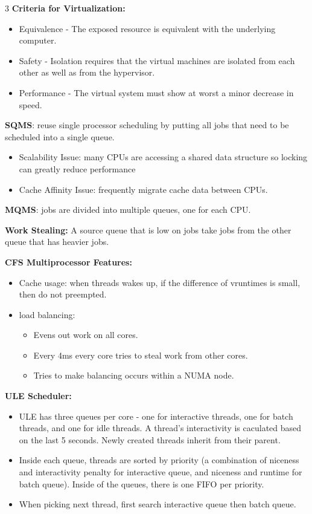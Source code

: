 \documentclass[8pt]{innovativeinnovation-cheatsheet}
\begin{document}
\begin{multicols*}{3}
\textbf{Criteria for Virtualization:}
\begin{itemize}
      \item Equivalence - The exposed resource is equivalent with the underlying computer.
      \item Safety - Isolation requires that the virtual machines are isolated from each other as well as from the hypervisor.
      \item Performance - The virtual system must show at worst a minor decrease in speed.
\end{itemize}


\textbf{SQMS}: reuse single processor scheduling by putting all jobs that need to be scheduled into a single queue. 
\begin{itemize}
      \item Scalability Issue: many CPUs are accessing a shared data structure so locking can greatly reduce performance
      \item Cache Affinity Issue: frequently migrate cache data between CPUs.
\end{itemize}

\textbf{MQMS}: jobs are divided into multiple queues, one for each CPU.

\textbf{Work Stealing:} A source queue that is low on jobs take jobs from the other queue that has heavier jobs.

\textbf{CFS Multiprocessor Features:}
\begin{itemize}
      \item Cache usage: when threads wakes up, if the difference of vruntimes is small, then do not preempted.
      \item load balancing: 
      \begin{itemize}
            \item Evens out work on all cores.
            \item Every 4ms every core tries to steal work from other cores.
            \item Tries to make balancing occurs within a NUMA node.
      \end{itemize}
\end{itemize}

\textbf{ULE Scheduler:}
\begin{itemize}
      \item ULE has three queues per core - one for interactive threads, one for batch threads, and one for idle threads. A thread's interactivity is caculated based on the last 5 seconds. Newly created threads inherit from their parent.
      \item Inside each queue, threads are sorted by priority (a combination of niceness and interactivity penalty for interactive queue, and niceness and runtime for batch queue). Inside of the queues, there is one FIFO per priority.
      \item When picking next thread, first search interactive queue then batch queue.
\end{itemize}


\end{multicols*}
\end{document}
